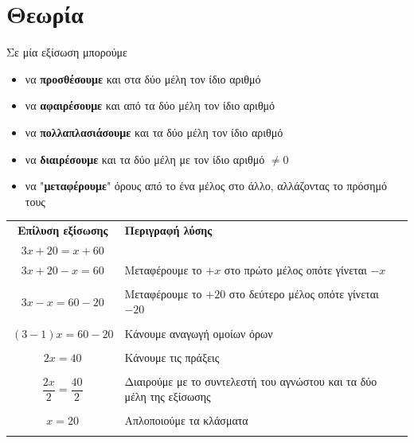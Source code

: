 \documentclass[a4paper,10pt]{report}
\begin{document}
\section*{Θεωρία \hfill \small{}}
Σε μία εξίσωση μπορούμε
\begin{itemize}
 \item να \textbf{προσθέσουμε} και στα δύο μέλη τον ίδιο αριθμό
 \item να \textbf{αφαιρέσουμε} και από τα δύο μέλη τον ίδιο αριθμό
 \item να \textbf{πολλαπλασιάσουμε} και τα δύο μέλη τον ίδιο αριθμό
 \item να \textbf{διαιρέσουμε} και τα δύο μέλη με τον ίδιο αριθμό $\neq0$
 \item να "\textbf{μεταφέρουμε}" όρους από το ένα μέλος στο άλλο, αλλάζοντας το πρόσημό τους
\end{itemize}
\begin{center}
 \begin{tabular}{|c|l|}\hline 
\textbf{Επίλυση εξίσωσης} \quad        &    \textbf{Περιγραφή λύσης}       \\
$3x+20=x+60$     \quad \quad                 &         \\
\hline 
 $3x+20-x=60$                                 & Μεταφέρουμε το $+x$ στο πρώτο μέλος οπότε γίνεται $-x$ \\ 
                                  & \\                               
\hline
$3x-x=60-20$                                  &  Μεταφέρουμε το $+20$ στο δεύτερο μέλος οπότε γίνεται $-20$        \\
                                  & \\                               
 
\hline
$(3-1)x=60-20$                                  & Κάνουμε αναγωγή ομοίων όρων       \\
                                  & \\
\hline
$2x=40$                                  & Κάνουμε τις πράξεις       \\
                                  & \\
\hline
$\dfrac{2x}{2}=\dfrac{40}{2}$      &  Διαιρούμε με το συντελεστή του αγνώστου και τα δύο μέλη της εξίσωσης      \\
                                  & \\  
\hline
$x=20$                                  &  Απλοποιούμε τα κλάσματα       \\
                                  & \\ 
\hline 
\end{tabular}
\end{center}
\end{document}
